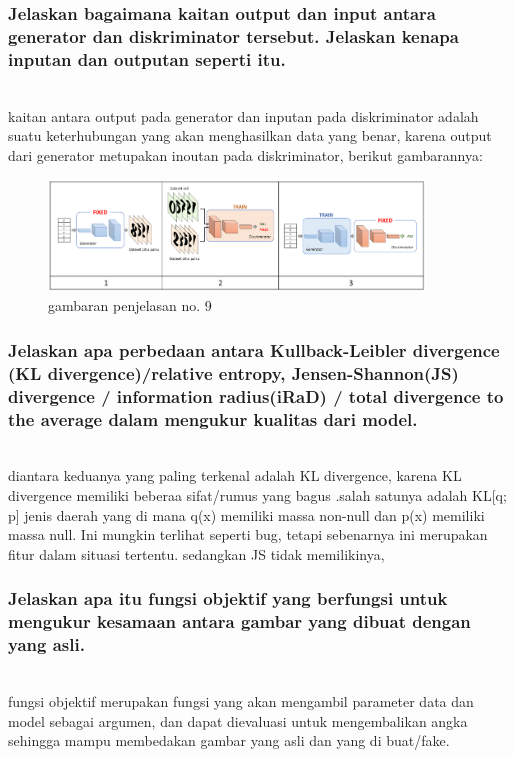 \subsubsection{Jelaskan bagaimana kaitan output dan input antara generator dan diskriminator tersebut. Jelaskan kenapa inputan dan outputan seperti itu.}
\hfill\\
kaitan antara output pada generator dan inputan pada diskriminator adalah suatu keterhubungan yang akan menghasilkan data yang benar, karena output dari generator metupakan inoutan pada diskriminator, berikut gambarannya:
\begin{figure}[H]
	\centering
	\includegraphics[width=10cm]{figures/1174083/figures8/9.png}
	\caption{gambaran penjelasan no. 9}
\end{figure}

\subsubsection{Jelaskan apa perbedaan antara Kullback-Leibler divergence (KL divergence)/relative entropy, Jensen-Shannon(JS) divergence / information radius(iRaD) / total divergence to the average dalam mengukur kualitas dari model.}
\hfill\\
diantara keduanya yang paling terkenal adalah KL divergence, karena KL divergence memiliki beberaa sifat/rumus yang bagus .salah satunya adalah KL[q; p] jenis daerah yang di mana q(x) memiliki massa non-null dan p(x) memiliki massa null. Ini mungkin terlihat seperti bug, tetapi sebenarnya ini merupakan fitur dalam situasi tertentu. sedangkan JS tidak memilikinya,

\subsubsection{Jelaskan apa itu fungsi objektif yang berfungsi untuk mengukur kesamaan antara gambar yang dibuat dengan yang asli.} 
\hfill\\
fungsi objektif merupakan fungsi yang akan mengambil parameter data dan model sebagai argumen, dan dapat dievaluasi untuk mengembalikan angka sehingga mampu membedakan gambar yang asli dan yang di buat/fake.

